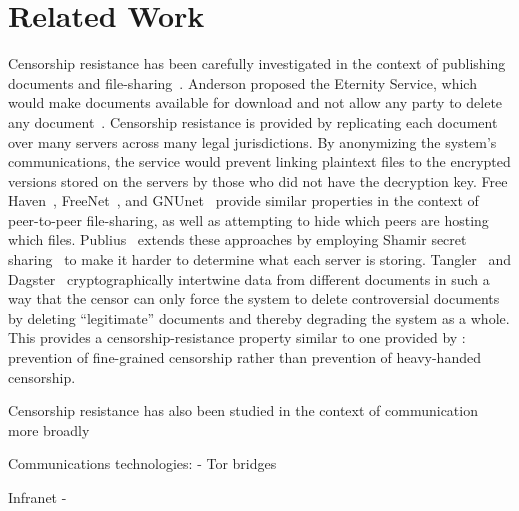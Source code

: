 \section{Related Work}

Censorship resistance has been carefully investigated in the context of
publishing documents and
file-sharing~\cite{eternity,freehaven,freenet,gnunet-esed,publius,tangler,dagster}.
Anderson proposed the Eternity Service, which would make documents
available for download and not allow any party to delete any
document~\cite{eternity}. Censorship resistance is provided by
replicating each document over many servers across many legal
jurisdictions. By anonymizing the system's communications, the service
would prevent linking plaintext files to the encrypted versions stored
on the servers by those who did not have the decryption key. Free
Haven~\cite{freehaven}, FreeNet~\cite{freenet}, and
GNUnet~\cite{gnunet-esed} provide similar properties in the context of
peer-to-peer file-sharing, as well as attempting to hide which peers are
hosting which files. Publius~\cite{publius} extends these approaches by
employing Shamir secret sharing~\cite{shamir} to make it harder to
determine what each server is storing. Tangler~\cite{tangler} and
Dagster~\cite{dagster} cryptographically intertwine data from different
documents in such a way that the censor can only force the system to
delete controversial documents by deleting ``legitimate'' documents and
thereby degrading the system as a whole. This provides a
censorship-resistance property similar to one provided by \hoot:
prevention of fine-grained censorship rather than prevention of
heavy-handed censorship.

Censorship resistance has also been studied in the context of
communication more broadly

Communications technologies:
- Tor bridges


Infranet
- 

\balance



%
